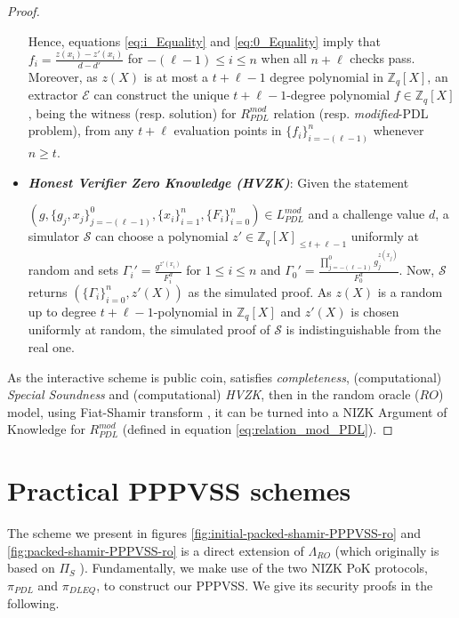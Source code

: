 \begin{proof}
\begin{itemize}
      Hence, equations \ref{eq:i_Equality} and \ref{eq:0_Equality} imply that $f_i=\frac{z(x_i)-z'(x_i)}{d-d'}$ for 
      $-(\ell-1)\leq i\leq n$ when all $n+\ell$ checks pass. Moreover, as $z(X)$ is at most a $t+\ell-1$ degree 
      polynomial in $\mathbb{Z}_q[X]$, an extractor $\mathcal{E}$ can construct the unique $t+\ell-1$-degree 
      polynomial $f\in\mathbb{Z}_q[X]$, being the witness (resp. solution) for $R_{PDL}^{mod}$ relation (resp. \textit{modified}-PDL problem), 
      from any $t+\ell$ evaluation points in $\{f_i\}_{i=-(\ell-1)}^n$ whenever $n\geq t$.
    \item \textit{\textbf{Honest Verifier Zero Knowledge (HVZK)}}: Given the statement\par $(g,\{g_j,x_j\}_{j=-(\ell-1)}^0,\{x_i\}_{i=1}^n,\{F_i\}_{i=0}^n)\in L_{PDL}^{mod}$  
      and a challenge value $d$, a simulator $\mathcal{S}$ can choose a polynomial $z'\in\mathbb{Z}_q[X]_{\leq t+\ell-1}$ uniformly 
      at random and sets $\Gamma_i'=\frac{g^{z'(x_i)}}{F_i^d}$ for $1\leq i\leq n$ and $\Gamma_0'=\frac{\prod_{j=-(\ell-1)}^{0}g_j^{z(x_j)}}{F_0^d}$. 
      Now, $\mathcal{S}$ returns $(\{\Gamma_i\}_{i=0}^n,z'(X))$ as the simulated proof. As $z(X)$ is a random 
      up to degree $t+\ell-1$-polynomial in $\mathbb{Z}_q[X]$ and $z'(X)$ is chosen uniformly at random, 
      the simulated proof of $\mathcal{S}$ is indistinguishable from the real one.
  \end{itemize}
  As the interactive scheme is public coin, satisfies \textit{completeness}, (computational) \textit{Special Soundness} 
  and (computational) \textit{HVZK}, then in the random oracle ($RO$) model, using Fiat-Shamir transform \cite{10.1007/3-540-47721-7_12}, 
  it can be turned into a NIZK Argument of Knowledge for $R_{PDL}^{mod}$ (defined in equation \ref{eq:relation_mod_PDL}).
\end{proof}


\section{Practical PPPVSS schemes}

The scheme we present in figures \ref{fig:initial-packed-shamir-PPPVSS-ro} and \ref{fig:packed-shamir-PPPVSS-ro} is a direct extension of $\Lambda_{RO}$ \cite{cryptoeprint:2025/576} 
(which originally is based on $\Pi_S$ \cite{cryptoeprint:2023/1669}). Fundamentally, we make use of the two NIZK 
PoK protocols, $\pi_{PDL}$ and $\pi_{DLEQ}$, to construct our PPPVSS. We give its security proofs in the following. 

